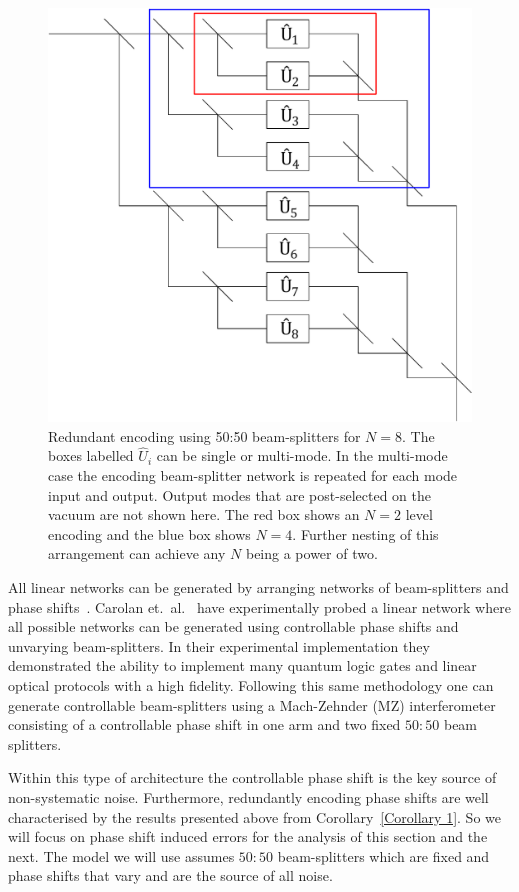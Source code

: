 \documentclass[aps,pra,twocolumn,superscriptaddress,numerical,floatfix]{revtex4-1}
\begin{document}
\begin{figure}[tbh]
	\includegraphics[width=\columnwidth]{unitaries.pdf}
	\caption{\label{fig:gen system}Redundant encoding using 50:50 beam-splitters for $N=8$. The boxes labelled $\hat{U}_i$ can be single or multi-mode.  In the multi-mode case the encoding beam-splitter network is repeated for each mode input and output. Output modes that are post-selected on the vacuum are not shown here. The red box shows an $N=2$ level encoding and the blue box shows $N=4$.  Further nesting of this arrangement can achieve any $N$ being a power of two.}
\end{figure} 

All linear networks can be generated by arranging networks of beam-splitters and phase shifts~\cite{reck}.  Carolan et.~al.~\cite{ULO} have experimentally probed a linear network where all possible networks can be generated using controllable phase shifts and unvarying beam-splitters.  In their experimental implementation they demonstrated the ability to implement many quantum logic gates and linear optical protocols with a high fidelity.  Following this same methodology one can generate controllable beam-splitters using a Mach-Zehnder (MZ) interferometer consisting of a controllable phase shift in one arm and two fixed $50:50$ beam splitters.

Within this type of architecture the controllable phase shift is the key source of non-systematic noise.  Furthermore, redundantly encoding phase shifts are well characterised by the results presented above from Corollary~\ref{Corollary 1}.  So we will focus on phase shift induced errors for the analysis of this section and the next.  The model we will use assumes $50:50$ beam-splitters which are fixed and phase shifts that vary and are the source of all noise.
\end{document}
